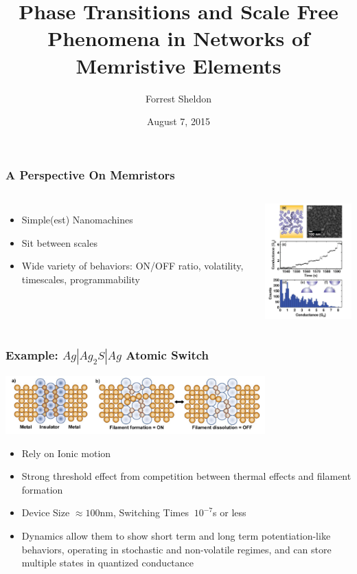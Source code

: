 \documentclass[mathserif]{beamer}
\title{Phase Transitions and Scale Free Phenomena in Networks of Memristive Elements}
\author{Forrest Sheldon}
\date{August 7, 2015}
\begin{document}
\begin{frame}
\titlepage
\end{frame}

\begin{frame}
\frametitle{A Perspective On Memristors}

\begin{columns}
\begin{itemize}
\item Simple(est) Nanomachines
\item Sit between scales
\item Wide variety of behaviors: ON/OFF ratio, volatility, timescales, programmability

\end{itemize}
\includegraphics[width=5cm]{Granular_Material.png}
\end{columns}
\end{frame}

\begin{frame}
\frametitle{Example: $Ag|Ag_2 S|Ag$ Atomic Switch}
\begin{center}
\includegraphics[width=10cm]{Atomic_Switch_Filament.png}
\end{center}
\begin{itemize}
\item Rely on Ionic motion
\item Strong threshold effect from competition between thermal effects and filament formation
\item Device Size $\approx 100$nm, Switching Times $~10^{-7}$s or less
\item Dynamics allow them to show short term and long term potentiation-like behaviors,
operating in stochastic and non-volatile regimes, and can store multiple states in quantized conductance

\end{itemize}
\end{frame}
\end{document}
